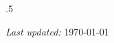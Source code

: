 \documentclass[margin, 10pt]{res} %
\begin{document}
\begin{resume}

\moveleft.5\hoffset\centerline{
\textit{Last updated:}
\today
}

\end{resume}
\end{document}
